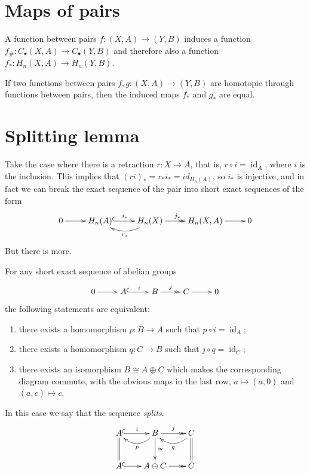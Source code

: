 \section{Maps of pairs}
\label{section-maps-of-pairs}

\begin{remark}
A function between pairs $f:(X,A)\to(Y,B)$
induces a function
$f_\#:C_\bullet(X,A)\to C_\bullet(Y,B)$ and
therefore also a
function $f_*:H_n(X,A)\to H_n(Y,B)$.
\end{remark}

\begin{proposition}
If two functions between pairs
$f,g:(X,A)\to(Y,B)$ are
homotopic through functions between pairs,
then the induced
maps $f_*$ and $g_*$ are equal.
\end{proposition}
\section{Splitting lemma}
\label{section-splitting-lemma}
\label{subsec:splitting}

Take the case where there is a retraction
$r:X\to A$, that
is, $r\circ i=\operatorname{id}_A$, where
$i$ is the inclusion.
This implies that
$(ri)_*=r_*i_*=id_{H_n(A)}$, so $i_*$ is
injective, and in
fact we can break the exact sequence of the
pair into short
exact sequences of the form
$$
\xymatrix{
0 \ar[r]
 & H_n(A) \ar@{^{(}->}[r]^{i_*}
 & H_n(X) \ar@{->>}[r]^{j_*}
   \ar@/^1pc/[l]^{r_*}
 & H_n(X,A) \ar[r]
 & 0
}
$$
But there is more.

\begin{lemma}
For any short exact sequence of abelian
groups
$$
\xymatrix{
0 \ar[r]
 & A \ar@{^{(}->}[r]^i
 & B \ar@{->>}[r]^j
 & C \ar[r]
 & 0
}
$$
the following statements are equivalent:
\begin{enumerate}
\item[(a)] there exists a homomorphism
$p:B\to A$ such that
$p\circ i=\operatorname{id}_A$;
\item[(b)] there exists a homomorphism
$q:C\to B$ such that
$j\circ q=\operatorname{id}_C$;
\item[(c)] there exists an isomorphism
$B\cong A\oplus C$
which makes the corresponding diagram
commute, with the
obvious maps in the last row, $a\mapsto(a,0)$
and
$(a,c)\mapsto c$.
\end{enumerate}
In this case we say that the sequence
\emph{splits}.
$$
\xymatrix@C=2em@R=2.6em{
A \ar@{^{(}->}[r]^i \ar@{=}[d]
 & B \ar@{->>}[r]^j \ar[d]^{\cong}
   \ar@/^1pc/[l]^p
 & C \ar@{=}[d] \ar@/^1pc/[l]^q \\
A \ar@{^{(}->}[r]
 & A\oplus C \ar@{->>}[r]
 & C
}
$$
\end{lemma}

